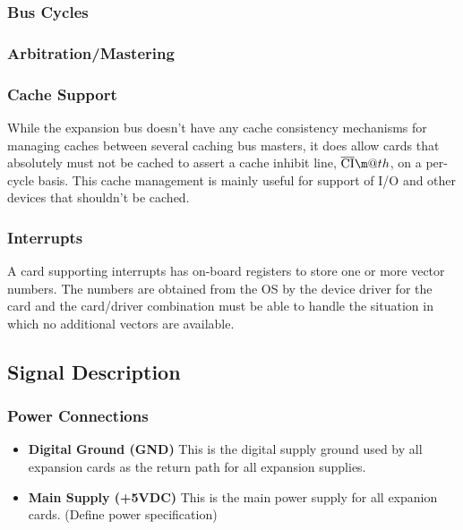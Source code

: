 \documentclass{article}
\makeatletter
\newcommand*{\textoverline}[1]{$\overline{\hbox{#1}}\m@th$}
\makeatother
\begin{document}
\subsubsection{Bus Cycles}

\subsubsection{Arbitration/Mastering}

\subsubsection{Cache Support}

While the expansion bus doesn't have any cache consistency mechanisms for
managing caches between several caching bus masters, it does allow cards that
absolutely must not be cached to assert a cache inhibit line,
\textoverline{CI}, on a per-cycle basis. This cache management is mainly useful
for support of I/O and other devices that shouldn't be cached.

\subsubsection{Interrupts}

A card supporting interrupts has on-board registers to store one or more vector
numbers. The numbers are obtained from the OS by the device driver for the card
and the card/driver combination must be able to handle the situation in which no
additional vectors are available.

\subsection{Signal Description}

\subsubsection{Power Connections}

\begin{itemize}
	\item{\textbf{Digital Ground (GND)}} This is the digital supply ground
	used by all expansion cards as the return path for all expansion
	supplies.

	\item{\textbf{Main Supply (+5VDC)}} This is the main power supply for
	all expanion cards. (Define power specification)

\end{itemize}
\end{document}
